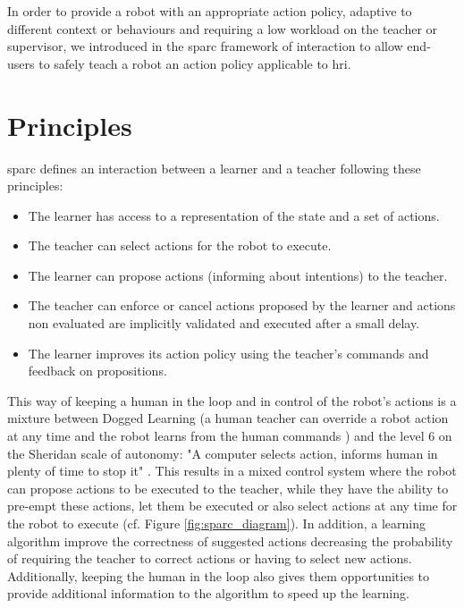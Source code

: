 In order to provide a robot with an appropriate action policy, adaptive to different context or behaviours and requiring a low workload on the teacher or supervisor, we introduced in \cite{senft2015sparc} the \acrfull{sparc} framework of interaction to allow end-users to safely teach a robot an action policy applicable to \gls{hri}.

\section{Principles} \label{sec:sparc_principles}

\gls{sparc} defines an interaction between a learner and a teacher following these principles:
\begin{itemize}
	\item The learner has access to a representation of the state and a set of actions.
	\item The teacher can select actions for the robot to execute.
	\item The learner can propose actions (informing about intentions) to the teacher.
	\item The teacher can enforce or cancel actions proposed by the learner and actions non evaluated are implicitly validated and executed after a small delay.
	\item The learner improves its action policy using the teacher's commands and feedback on propositions.
\end{itemize} 

This way of keeping a human in the loop and in control of the robot's actions is a mixture between Dogged Learning (a human teacher can override a  robot action at any time and the robot learns from the human commands \citealt{grollman2007dogged}) and the level 6 on the Sheridan scale of autonomy: "A computer selects action, informs human in plenty of time to stop it" \citep{sheridan1978human}. This results in a mixed control system where the robot can propose actions to be executed to the teacher, while they have the ability to pre-empt these actions, let them be executed or also select actions at any time for the robot to execute (cf. Figure \ref{fig:sparc_diagram}). In addition, a learning algorithm improve the correctness of suggested actions decreasing the probability of requiring the teacher to correct actions or having to select new actions. Additionally, keeping the human in the loop also gives them opportunities to provide additional information to the algorithm to speed up the learning.

